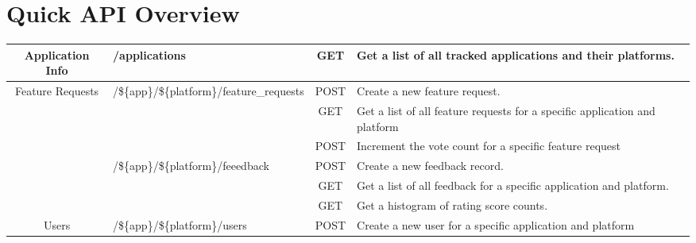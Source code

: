 
\section{Quick API Overview}

\begin{tabular}{ |c||l||c||p{4cm}| }
\hline

Application Info & /applications & GET & Get a list of all tracked applications and their platforms. \\

\hline
\hline

\multirow{5}{*}{Feature Requests}
&
\multirow{3}{*}{/\$\{app\}/\$\{platform\}/feature\_requests}
& POST & Create a new feature request. \\
\cline{3-4}
&& GET & Get a list of all feature requests for a specific application and platform \\
\cline{2-4}
& /\$\{app\}/\$\{platform\}/feature\_requests/\$\{id\}/votes
& POST & Increment the vote count for a specific feature request \\

\hline
\hline

\multirow{5}{*}{Feedback}
&
\multirow{3}{*}{/\$\{app\}/\$\{platform\}/feeedback}
& POST & Create a new feedback record. \\
\cline{3-4}
&& GET & Get a list of all feedback for a specific application and platform. \\
\cline{2-4}
& /\$\{app\}/\$\{platform\}/feedback/histogram
& GET & Get a histogram of rating score counts. \\

\hline
\hline

Users & /\$\{app\}/\$\{platform\}/users
& POST & Create a new user for a specific application and platform \\

\hline
\end{tabular}
